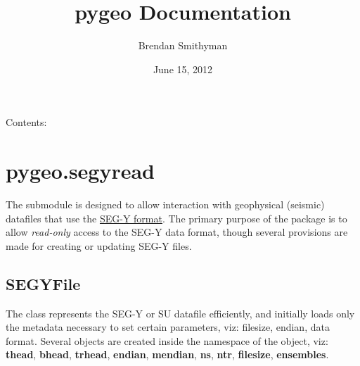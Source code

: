 \documentclass[letterpaper,10pt,english]{sphinxmanual}
\title{pygeo Documentation}
\date{June 15, 2012}
\author{Brendan Smithyman}
\begin{document}
\maketitle
\tableofcontents
{}\label{index::doc}


Contents:


\chapter{pygeo.segyread}
\label{segyread:welcome-to-pygeo-s-documentation}\label{segyread:pygeo-segyread}\label{segyread::doc}
The {\hyperref[segyread:module-pygeo.segyread]{}} submodule is designed to allow interaction with geophysical (seismic) datafiles that use the \href{http://en.wikipedia.org/wiki/SEG-Y}{SEG-Y format}.  The primary purpose of the package is to allow \emph{read-only} access to the SEG-Y data format, though several provisions are made for creating or updating SEG-Y files.
\label{segyread:module-pygeo.segyread}\label{segyread:module-pygeo.segyread}

\section{SEGYFile}
\label{segyread:segyfile}
The  {\hyperref[segyread:pygeo.segyread.SEGYFile]{}} class represents the SEG-Y or SU datafile efficiently, and initially loads only the metadata necessary to set certain parameters, viz: filesize, endian, data format.  Several objects are created inside the namespace of the {\hyperref[segyread:pygeo.segyread.SEGYFile]{}} object, viz: \textbf{thead}, \textbf{bhead}, \textbf{trhead}, \textbf{endian}, \textbf{mendian}, \textbf{ns}, \textbf{ntr}, \textbf{filesize}, \textbf{ensembles}.
\end{document}
